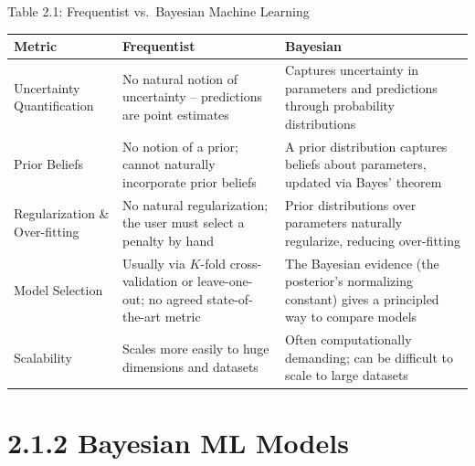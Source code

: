 \documentclass[aspectratio=169,10pt]{beamer}
\begin{document}
\begin{frame}{Table 2.1: Frequentist vs.\ Bayesian Machine Learning}
  \small
  \begin{tabular}{p{2.4cm}p{4.6cm}p{4.6cm}}
    \toprule
    \textbf{Metric} & \textbf{Frequentist} & \textbf{Bayesian} \\
    \midrule
    Uncertainty Quantification &
      No natural notion of uncertainty -- predictions are point estimates &
      Captures uncertainty in parameters and predictions through
      probability distributions \\[2pt]
    Prior Beliefs &
      No notion of a prior; cannot naturally incorporate prior beliefs &
      A prior distribution captures beliefs about parameters, updated via
      Bayes' theorem \\[2pt]
    Regularization \& Over-fitting &
      No natural regularization; the user must select a penalty by hand &
      Prior distributions over parameters naturally regularize, reducing
      over-fitting \\[2pt]
    Model Selection &
      Usually via $K$-fold cross-validation or leave-one-out; no agreed
      state-of-the-art metric &
      The Bayesian evidence (the posterior's normalizing constant) gives a
      principled way to compare models \\[2pt]
    Scalability &
      Scales more easily to huge dimensions and datasets &
      Often computationally demanding; can be difficult to scale to large
      datasets \\
    \bottomrule
  \end{tabular}
\end{frame}

\section{2.1.2 Bayesian ML Models}
\end{document}
